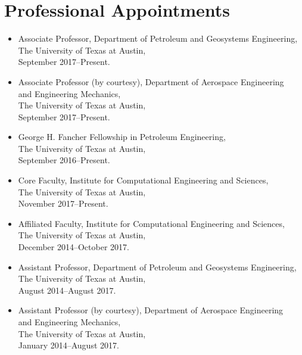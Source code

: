 \ifdefined\ispdf
\section*{Professional Appointments}

\begin{itemize}
    \item Associate Professor, Department of Petroleum and Geosystems Engineering, \\ 
          The University of Texas at Austin, \\
          September 2017--Present. 

    \item Associate Professor (by courtesy), Department of Aerospace Engineering \\ 
          and Engineering Mechanics, \\ 
          The University of Texas at Austin, \\
          September 2017--Present. 

    \item George H. Fancher Fellowship in Petroleum Engineering, \\ 
          The University of Texas at Austin, \\
          September 2016--Present. 

    \item Core Faculty, Institute for Computational Engineering and Sciences, \\ 
          The University of Texas at Austin, \\
          November 2017--Present. 

    \item Affiliated Faculty, Institute for Computational Engineering and Sciences, \\ 
          The University of Texas at Austin, \\
          December 2014--October 2017. 

    \item Assistant Professor, Department of Petroleum and Geosystems Engineering, \\ 
          The University of Texas at Austin, \\
          August 2014--August 2017. 

    \item Assistant Professor (by courtesy), Department of Aerospace Engineering \\ 
          and Engineering Mechanics, \\ 
          The University of Texas at Austin, \\
          January 2014--August 2017. 


\end{itemize}
